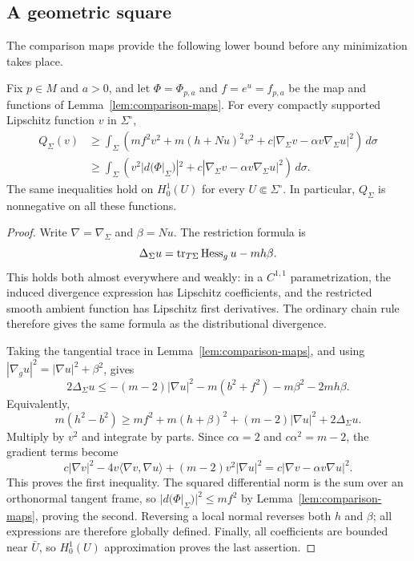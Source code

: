 \subsection{A geometric square}

The comparison maps provide the following lower bound before any
minimization takes place.

\begin{lemma}
\label{lem:square-estimate}
Fix $p\in M$ and $a>0$, and let $\Phi=\Phi_{p,a}$ and
$f=e^u=f_{p,a}$ be the map and functions of
Lemma~\ref{lem:comparison-maps}. For every compactly supported
Lipschitz function $v$ in $\Sigma^\circ$,
\begin{equation}
\label{eq:square-estimate}
\begin{aligned}
 Q_\Sigma(v)
 &\ge\int_\Sigma\left(
 mf^2v^2+m(h+Nu)^2v^2
 +c|\nabla_\Sigma v-\alpha v\nabla_\Sigma u|^2\right)\,d\sigma\\
 &\ge\int_\Sigma\left(
 v^2|d(\Phi|_\Sigma)|^2
 +c|\nabla_\Sigma v-\alpha v\nabla_\Sigma u|^2\right)\,d\sigma.
\end{aligned}
\end{equation}
The same inequalities hold on $H^1_0(U)$ for every
$U\Subset\Sigma^\circ$. In particular, $Q_\Sigma$ is nonnegative
on all these functions.
\end{lemma}

\begin{proof}
Write $\nabla=\nabla_\Sigma$ and $\beta=Nu$. The restriction formula is
\begin{equation}
\label{eq:sobolev-restriction-laplacian}
 \Delta_\Sigma u=\operatorname{tr}_{T\Sigma}\operatorname{Hess}_g u-mh\beta.
\end{equation}
This holds both almost everywhere and weakly: in a $C^{1,1}$
parametrization, the induced divergence expression has Lipschitz
coefficients, and the restricted smooth ambient function has Lipschitz
first derivatives. The ordinary chain rule therefore gives the same
formula as the distributional divergence.

Taking the tangential trace in Lemma~\ref{lem:comparison-maps}, and
using $|\nabla_g u|^2=|\nabla u|^2+\beta^2$, gives
\[
 2\Delta_\Sigma u
 \le -(m-2)|\nabla u|^2-m(b^2+f^2)-m\beta^2-2mh\beta.
\]
Equivalently,
\[
 m(h^2-b^2)\ge
 mf^2+m(h+\beta)^2+(m-2)|\nabla u|^2+2\Delta_\Sigma u.
\]
Multiply by $v^2$ and integrate by parts. Since
$c\alpha=2$ and $c\alpha^2=m-2$, the gradient terms become
\[
 c|\nabla v|^2-4v\langle\nabla v,\nabla u\rangle
 +(m-2)v^2|\nabla u|^2
 =c|\nabla v-\alpha v\nabla u|^2.
\]
This proves the first inequality. The squared differential norm is the
sum over an orthonormal tangent frame, so
$|d(\Phi|_\Sigma)|^2\le mf^2$ by
Lemma~\ref{lem:comparison-maps}, proving the second.
Reversing a local normal reverses both $h$ and $\beta$; all expressions
are therefore globally defined. Finally, all coefficients are bounded
near $\bar U$, so $H^1_0(U)$ approximation proves the last assertion.
\end{proof}

